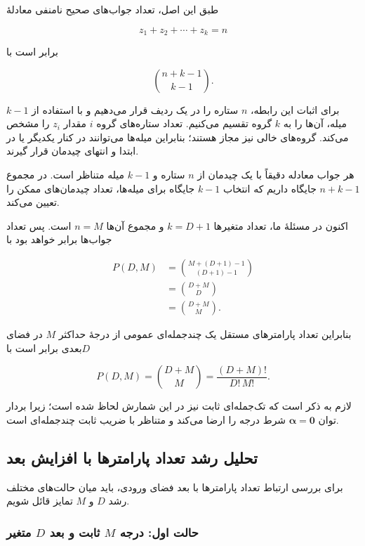 \documentclass[12pt,a4paper]{article}
\begin{document}
طبق این اصل، تعداد جواب‌های صحیح نامنفی معادلۀ

\[
z_1+z_2+\cdots+z_k=n
\]

برابر است با

\[
\binom{n+k-1}{k-1}.
\]

برای اثبات این رابطه، $n$ ستاره را
در یک ردیف قرار می‌دهیم و با استفاده از
$k-1$ میله، آن‌ها را به $k$ گروه تقسیم می‌کنیم.
تعداد ستاره‌های گروه $i$ مقدار $z_i$ را
مشخص می‌کند. گروه‌های خالی نیز مجاز هستند؛
بنابراین میله‌ها می‌توانند در کنار یکدیگر
یا در ابتدا و انتهای چیدمان قرار گیرند.

هر جواب معادله دقیقاً با یک چیدمان
از $n$ ستاره و $k-1$ میله متناظر است.
در مجموع $n+k-1$ جایگاه داریم که
انتخاب $k-1$ جایگاه برای میله‌ها،
تعداد چیدمان‌های ممکن را تعیین می‌کند.

اکنون در مسئلۀ ما، تعداد متغیرها
$k=D+1$ و مجموع آن‌ها $n=M$ است.
پس تعداد جواب‌ها برابر خواهد بود با

\[
\begin{aligned}
P(D,M)
&=\binom{M+(D+1)-1}{(D+1)-1}\\[4pt]
&=\binom{D+M}{D}\\[4pt]
&=\binom{D+M}{M}.
\end{aligned}
\]

بنابراین تعداد پارامترهای مستقل
یک چندجمله‌ای عمومی از درجۀ حداکثر
$M$ در فضای $D$بعدی برابر است با

\[
\boxed{
P(D,M)=\binom{D+M}{M}
=\frac{(D+M)!}{D!\,M!}.
}
\]

لازم به ذکر است که تک‌جمله‌ای ثابت
نیز در این شمارش لحاظ شده است؛
زیرا بردار توان
$\boldsymbol{\alpha}=\mathbf{0}$
شرط درجه را ارضا می‌کند و متناظر با
ضریب ثابت چندجمله‌ای است.


\subsection{تحلیل رشد تعداد پارامترها با افزایش بعد}

برای بررسی ارتباط تعداد پارامترها با بعد
فضای ورودی، باید میان حالت‌های مختلف
رشد $D$ و $M$ تمایز قائل شویم.


\subsubsection{حالت اول: درجه \texorpdfstring{$M$}{M} ثابت و بعد \texorpdfstring{$D$}{D} متغیر}
\end{document}
